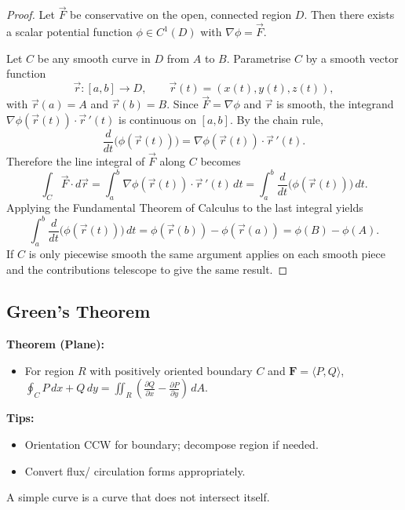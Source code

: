 \documentclass[11pt]{report}
\begin{document}
\begin{proof}
Let \(\vec F\) be conservative on the open, connected region \(D\). Then there exists a scalar potential function \(\phi\in C^1(D)\) with \(\nabla\phi=\vec F\).

Let \(C\) be any smooth curve in \(D\) from \(A\) to \(B\). Parametrise \(C\) by a smooth vector function
\[
\vec r:[a,b]\to D,\qquad \vec r(t)=(x(t),y(t),z(t)),
\]
with \(\vec r(a)=A\) and \(\vec r(b)=B\). Since \(\vec F=\nabla\phi\) and \(\vec r\) is smooth, the integrand \(\nabla\phi(\vec r(t))\cdot\vec r\,'(t)\) is continuous on \([a,b]\). By the chain rule,
\[
\frac{d}{dt}\big(\phi(\vec r(t))\big)
= \nabla\phi(\vec r(t))\cdot\vec r\,'(t).
\]
Therefore the line integral of \(\vec F\) along \(C\) becomes
\[
\int_C \vec F\cdot d\vec r
= \int_a^b \nabla\phi(\vec r(t))\cdot\vec r\,'(t)\,dt
= \int_a^b \frac{d}{dt}\big(\phi(\vec r(t))\big)\,dt.
\]
Applying the Fundamental Theorem of Calculus to the last integral yields
\[
\int_a^b \frac{d}{dt}\big(\phi(\vec r(t))\big)\,dt
= \phi(\vec r(b))-\phi(\vec r(a))
= \phi(B)-\phi(A).
\]
If \(C\) is only piecewise smooth the same argument applies on each smooth piece and the contributions telescope to give the same result.
\end{proof}

\subsection{Green's Theorem}

\begin{keybox}
	\textbf{Theorem (Plane):}
\begin{itemize}
    \item For region $R$ with positively oriented boundary $C$ and $\mathbf F=\langle P,Q\rangle$,
    $\displaystyle \oint_C P\,dx+Q\,dy=\iint_R \left(\frac{\partial Q}{\partial x}-\frac{\partial P}{\partial y}\right)\,dA$.
\end{itemize}
	\textbf{Tips:}
\begin{itemize}
    \item Orientation CCW for boundary; decompose region if needed.
    \item Convert flux/ circulation forms appropriately.
\end{itemize}
\end{keybox}
\begin{definition}
    A simple curve is a curve that does not intersect itself.
\end{definition}
\end{document}

